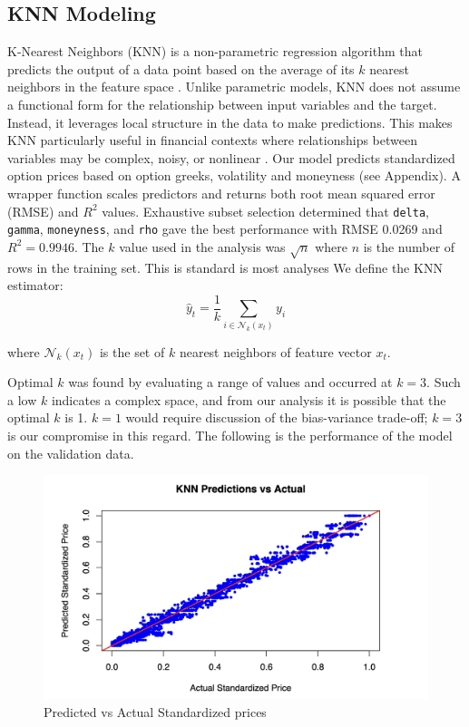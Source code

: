 \documentclass{article}
\begin{document}
\subsection{KNN Modeling}

K-Nearest Neighbors (KNN) is a non-parametric regression algorithm that predicts the output of a data point based on the average of its $k$ nearest neighbors in the feature space \citep{cover1967nearest}. Unlike parametric models, KNN does not assume a functional form for the relationship between input variables and the target. Instead, it leverages local structure in the data to make predictions. This makes KNN particularly useful in financial contexts where relationships between variables may be complex, noisy, or nonlinear \citep{altman1992introduction}. Our model predicts standardized option prices based on option greeks, volatility and moneyness (see Appendix). A wrapper function scales predictors and returns both root mean squared error (RMSE) and $R^2$ values. Exhaustive subset selection determined that \verb|delta|, \verb|gamma|, \verb|moneyness|, and \verb|rho| gave the best performance with RMSE 0.0269 and \( R^2 = 0.9946 \). The $k$ value used in the analysis was $\sqrt{n}$ where $n$ is the number of rows in the training set. This is standard is most analyses We define the KNN estimator:
\[
\hat{y}_t = \frac{1}{k} \sum_{i \in \mathcal{N}_k(x_t)} y_i
\]

where \( \mathcal{N}_k(x_t) \) is the set of \( k \) nearest neighbors of feature vector \( x_t \). \

Optimal $k$ was found by evaluating a range of values and occurred at $k=3$. Such a low $k$ indicates a complex space, and from our analysis it is possible that the optimal $k$ is 1. $k=1$ would require discussion of the bias-variance trade-off; $k=3$ is our compromise in this regard. The following is the performance of the model on the validation data.

\begin{figure}[h]
  \centering
  \includegraphics[width=0.8\linewidth]{data/results/knn_preds.png}
  \caption{Predicted vs Actual Standardized prices}
  \label{fig:price-diff}
\end{figure}
\end{document}
